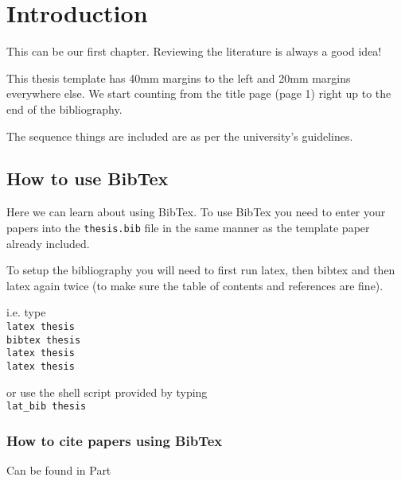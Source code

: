 \chapter{Introduction}\label{Introduction}

This can be our first chapter. Reviewing the literature is always a good idea!

This thesis template has 40mm margins to the left and 20mm margins everywhere else. We start counting from the title page (page 1) right up to the end of the bibliography.

The sequence things are included are as per the university's guidelines.



\section{How to use BibTex}

Here we can learn about using BibTex.
To use BibTex you need to enter your papers into the {\tt thesis.bib} file in the same manner as the template paper already included.

To setup the bibliography you will need to first run latex, then bibtex and then latex again twice (to make sure the table of contents and references are fine).

i.e. type \\ {\tt latex thesis} \\ {\tt bibtex thesis} \\ {\tt latex thesis} \\ {\tt latex thesis}

or use the shell script provided by typing \\ {\tt lat\_bib thesis}

\subsection{How to cite papers using BibTex}

Can be found in Part